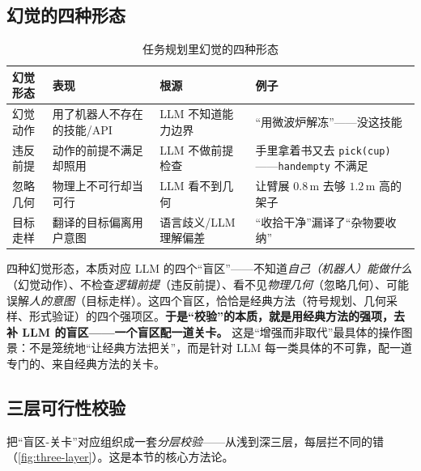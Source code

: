 \subsection{幻觉的四种形态}
\label{sec:hallucination-types}

\begin{table}[H]\centering\small
\caption{任务规划里幻觉的四种形态}
\label{tab:hallucination-types}
\begin{tabular}{p{2.4cm}p{3.6cm}p{2.8cm}p{3.6cm}}
\toprule
幻觉形态 & 表现 & 根源 & 例子 \\
\midrule
幻觉动作 & 用了机器人不存在的技能/API & LLM 不知道能力边界 & “用微波炉解冻”——没这技能 \\
违反前提 & 动作的前提不满足却照用 & LLM 不做前提检查 & 手里拿着书又去 \texttt{pick(cup)}——\texttt{handempty} 不满足 \\
忽略几何 & 物理上不可行却当可行 & LLM 看不到几何 & 让臂展 $0.8\,$m 去够 $1.2\,$m 高的架子 \\
目标走样 & 翻译的目标偏离用户意图 & 语言歧义/LLM 理解偏差 & “收拾干净”漏译了“杂物要收纳” \\
\bottomrule
\end{tabular}
\end{table}

\begin{insight}[盲区-关卡的一一对应]
四种幻觉形态，本质对应 LLM 的四个“盲区”——不知道\emph{自己（机器人）能做什么}（幻觉动作）、不检查\emph{逻辑前提}（违反前提）、看不见\emph{物理几何}（忽略几何）、可能误解\emph{人的意图}（目标走样）。这四个盲区，恰恰是经典方法（符号规划、几何采样、形式验证）的四个强项区。\textbf{于是“校验”的本质，就是用经典方法的强项，去补 LLM 的盲区——一个盲区配一道关卡。} 这是“增强而非取代”最具体的操作图景：不是笼统地“让经典方法把关”，而是针对 LLM 每一类具体的不可靠，配一道专门的、来自经典方法的关卡。
\end{insight}

\subsection{三层可行性校验}
\label{sec:three-layer-check}

把“盲区-关卡”对应组织成一套\emph{分层校验}——从浅到深三层，每层拦不同的错（\cref{fig:three-layer}）。这是本节的核心方法论。

